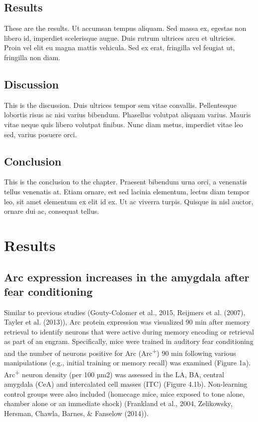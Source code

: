 \documentclass[12pt,a4paper,]{report}
\begin{document}
\section{Results}\label{results}

These are the results. Ut accumsan tempus aliquam. Sed massa ex, egestas
non libero id, imperdiet scelerisque augue. Duis rutrum ultrices arcu et
ultricies. Proin vel elit eu magna mattis vehicula. Sed ex erat,
fringilla vel feugiat ut, fringilla non diam.

\section{Discussion}\label{discussion}

This is the discussion. Duis ultrices tempor sem vitae convallis.
Pellentesque lobortis risus ac nisi varius bibendum. Phasellus volutpat
aliquam varius. Mauris vitae neque quis libero volutpat finibus. Nunc
diam metus, imperdiet vitae leo sed, varius posuere orci.

\section{Conclusion}\label{conclusion-1}

This is the conclusion to the chapter. Praesent bibendum urna orci, a
venenatis tellus venenatis at. Etiam ornare, est sed lacinia elementum,
lectus diam tempor leo, sit amet elementum ex elit id ex. Ut ac viverra
turpis. Quisque in nisl auctor, ornare dui ac, consequat tellus.

\chapter{Results}\label{results-1}

\section{Arc expression increases in the amygdala after fear
conditioning}\label{arc-expression-increases-in-the-amygdala-after-fear-conditioning}

Similar to previous studies (Gouty-Colomer et al., 2015, Reijmers et al.
(2007), Tayler et al. (2013)), Arc protein expression was visualized 90
min after memory retrieval to identify neurons that were active during
memory encoding or retrieval as part of an engram. Specifically, mice
were trained in auditory fear conditioning and the number of neurons
positive for Arc (Arc\textsuperscript{+}) 90 min following various
manipulations (e.g., initial training or memory recall) was examined
(Figure 1a). Arc\textsuperscript{+} neuron density (per 100 µm2) was
assessed in the LA, BA, central amygdala (CeA) and intercalated cell
masses (ITC) (Figure 4.1b). Non-learning control groups were also
included (homecage mice, mice exposed to tone alone, chamber alone or an
immediate shock) (Frankland et al., 2004, Zelikowsky, Hersman, Chawla,
Barnes, \& Fanselow (2014)).
\end{document}
